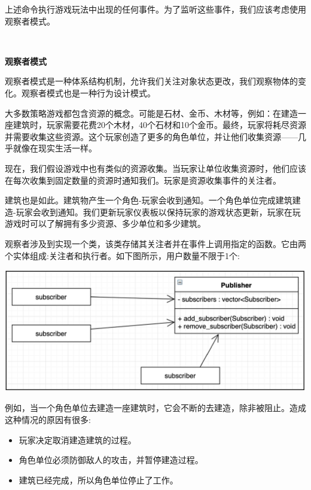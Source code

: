 上述命令执行游戏玩法中出现的任何事件。为了监听这些事件，我们应该考虑使用观察者模式。 \par

\noindent\textbf{}\ \par
\textbf{观察者模式} \ \par
观察者模式是一种体系结构机制，允许我们关注对象状态更改，我们观察物体的变化。观察者模式也是一种行为设计模式。 \par
大多数策略游戏都包含资源的概念。可能是石材、金币、木材等，例如：在建造一座建筑时，玩家需要花费20个木材，40个石材和10个金币。最终，玩家将耗尽资源并需要收集这些资源。这个玩家创造了更多的角色单位，并让他们收集资源——几乎就像在现实生活一样。 \par
现在，我们假设游戏中也有类似的资源收集。当玩家让单位收集资源时，他们应该在每次收集到固定数量的资源时通知我们。玩家是资源收集事件的关注者。 \par
建筑也是如此。建筑物产生一个角色-玩家会收到通知。一个角色单位完成建筑建造-玩家会收到通知。我们更新玩家仪表板以保持玩家的游戏状态更新，玩家在玩游戏时可以了解拥有多少资源、多少单位和多少建筑。 \par
观察者涉及到实现一个类，该类存储其关注者并在事件上调用指定的函数。它由两个实体组成:关注者和执行者。如下图所示，用户数量不限于1个: \par

\begin{center}
	\includegraphics[width=1.0\textwidth]{content/Section-2/Chapter-11/8}
\end{center}

例如，当一个角色单位去建造一座建筑时，它会不断的去建造，除非被阻止。造成这种情况的原因有很多: \par

\begin{itemize}
	\item 玩家决定取消建造建筑的过程。
	\item 角色单位必须防御敌人的攻击，并暂停建造过程。
	\item 建筑已经完成，所以角色单位停止了工作。
\end{itemize}

